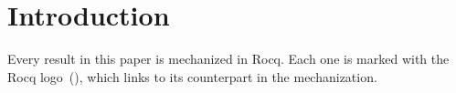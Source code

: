
\section{Introduction}
\label{sec:introduction}


Every result in this paper is mechanized in Rocq. Each one is marked with
the Rocq logo~(\rocqlogo), which links to its counterpart in the
mechanization.

